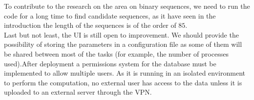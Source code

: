 \documentclass{tfg_domingo}
\begin{document}
To contribute to the research on the area on binary sequences, we need to run the code for a long time to find candidate sequences, as it have seen in the introduction the length of the sequences is of the order of $85$.\\

  Last but not least, the UI is still open to improvement. We should provide the
  possibility of storing the parameters in a configuration file as some of
  them will be shared between most of the tasks (for example, the number of
  processes used).After deployment a  permissions system for the database must be implemented to allow multiple users. As it is  running in an isolated
  environment to perform the computation, no external user has access to the
  data unless it is uploaded to an external server through the VPN.\\







\backmatter


\end{document}
